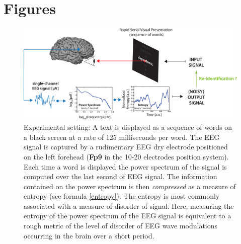 \section{Figures}

\begin{figure}[H]
\centering
\includegraphics[width=17cm]{figures/main.eps}
\caption{Experimental setting: A text is displayed as a sequence of words on a black screen at a rate of 125 milliseconds per word. The EEG signal is captured by a rudimentary EEG dry electrode positioned on the left forehead ({\bf Fp9} in the 10-20 electrodes position system). Each time a word is displayed the power spectrum of the signal is computed over the last second of EEG signal. The information contained on the power spectrum is then {\it compressed} as a measure of entropy (see formula \ref{entropy}). The entropy is most commonly associated with a measure of disorder of signal. Here, measuring the entropy of the power spectrum of the EEG signal is equivalent to a rough metric of the level of disorder of EEG wave modulations occurring in the brain over a short period.}
\label{fig:apparatus}
\end{figure}

\clearpage

